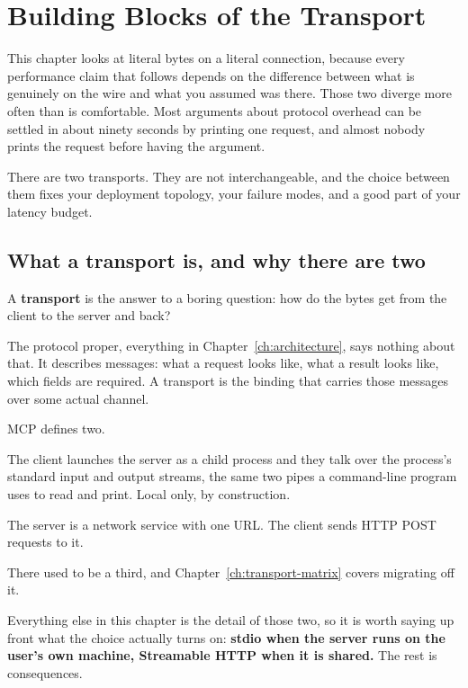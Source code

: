 \chapter{Building Blocks of the Transport}
\label{ch:transport}

This chapter looks at literal bytes on a literal connection, because every
performance claim that follows depends on the difference between what is
genuinely on the wire and what you assumed was there. Those two diverge more
often than is comfortable. Most arguments about protocol overhead can be settled
in about ninety seconds by printing one request, and almost nobody prints the
request before having the argument.

There are two transports. They are not interchangeable, and the choice between
them fixes your deployment topology, your failure modes, and a good part of your
latency budget.

\section{What a transport is, and why there are two}

A \textbf{transport} is the answer to a boring question: how do the bytes get
from the client to the server and back?

The protocol proper, everything in Chapter~\ref{ch:architecture}, says nothing
about that. It describes messages: what a request looks like, what a result
looks like, which fields are required. A transport is the binding that carries
those messages over some actual channel.

MCP defines two.

\begin{description}[leftmargin=1.4em, style=nextline, itemsep=5pt]
\item[stdio] The client launches the server as a child process and they talk
over the process's standard input and output streams, the same two pipes a
command-line program uses to read and print. Local only, by construction.
\item[Streamable HTTP] The server is a network service with one URL. The client
sends HTTP POST requests to it.
\end{description}

There used to be a third, and Chapter~\ref{ch:transport-matrix} covers migrating
off it.

Everything else in this chapter is the detail of those two, so it is worth
saying up front what the choice actually turns on: \textbf{stdio when the server
runs on the user's own machine, Streamable HTTP when it is shared.} The rest is
consequences.

